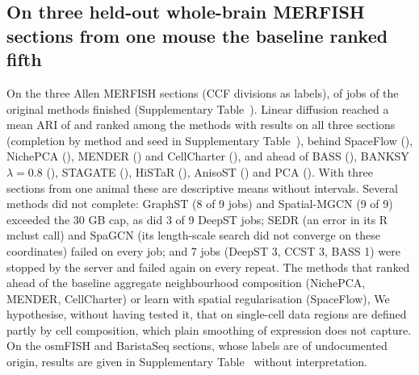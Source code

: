 \documentclass[unnumsec,webpdf,contemporary,large]{oup-authoring-template}
\begin{document}
\subsection{On three held-out whole-brain MERFISH sections from one mouse the baseline ranked fifth}
On the three Allen MERFISH sections (CCF divisions as labels), \rvAllenOk{} of \rvAllenJobs{} jobs of the original methods finished
(Supplementary Table~\STallen). Linear diffusion reached a mean ARI of \rvAllenLin{} and ranked \rvAllenRankLin{} among the \rvAllenNRanked{} methods with results on all three sections
(completion by method and seed in Supplementary Table~\STallencomp), behind SpaceFlow (\rvAllenSpaceflow), NichePCA (\rvAllenNichepca), MENDER (\rvAllenMender)
and CellCharter (\rvAllenCellcharter), and ahead of BASS (\rvAllenBass), BANKSY $\lambda=0.8$ (\rvAllenBanksyHi), STAGATE
(\rvAllenStagate), HiSTaR (\rvAllenHistar), AnisoST (\rvAllenAnisost) and PCA (\rvAllenPca). With three sections from one animal these
are descriptive means without intervals. Several methods did not complete: GraphST (8 of 9 jobs) and Spatial-MGCN (9 of 9) exceeded the
30 GB cap, as did 3 of 9 DeepST jobs; SEDR (an error in its R mclust call) and SpaGCN (its length-scale search did not converge on these
coordinates) failed on every job; and 7 jobs (DeepST 3, CCST 3, BASS 1) were stopped by the server and failed again on every repeat. The
methods that ranked ahead of the baseline aggregate neighbourhood composition (NichePCA, MENDER, CellCharter) or learn with spatial
regularisation (SpaceFlow), We hypothesise, without having tested it, that on single-cell data regions are defined partly by cell composition,
which plain smoothing of expression does not capture. On the osmFISH and BaristaSeq sections, whose labels are of undocumented origin, results
are given in Supplementary Table~\STsdm{} without interpretation.
\end{document}
